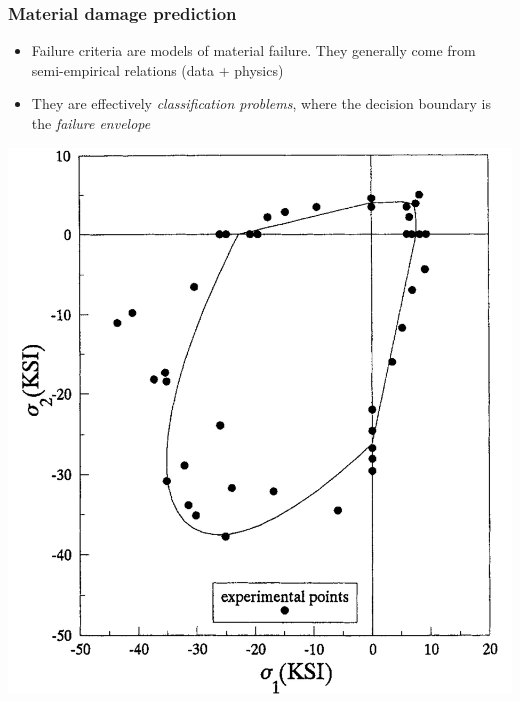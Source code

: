 \documentclass{beamer}
\begin{document}
    \begin{frame}
        \frametitle{Material damage prediction}
        \begin{minipage}{.45\textwidth}
            \small
            \begin{itemize}
                \item Failure criteria are models of material failure. They generally come from semi-empirical relations (data + physics)
                \item They are effectively \emph{classification problems}, where the decision boundary is the \emph{failure envelope}
            \end{itemize}
        \end{minipage}
        \begin{minipage}{.45\textwidth}
            \centering
            \includegraphics[width=\textwidth]{pics/fail-env-example.png}

        \end{minipage}
        
    \end{frame}
    
\end{document}
